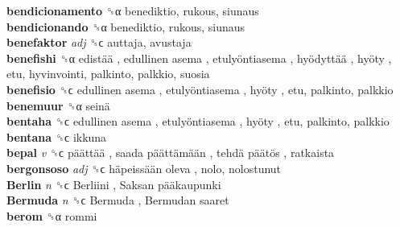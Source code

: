 \textbf{bendicionamento} ␝α  benediktio, rukous, siunaus  \\
\textbf{bendicionando} ␝α  benediktio, rukous, siunaus  \\
\textbf{benefaktor} \emph{adj}  ␝ϲ  auttaja, avustaja  \\
\textbf{benefishi} ␝α   edistää ,  edullinen asema ,  etulyöntiasema ,  hyödyttää ,  hyöty , etu, hyvinvointi, palkinto, palkkio, suosia  \\
\textbf{benefisio} ␝ϲ   edullinen asema ,  etulyöntiasema ,  hyöty , etu, palkinto, palkkio  \\
\textbf{benemuur} ␝α   seinä   \\
\textbf{bentaha} ␝ϲ   edullinen asema ,  etulyöntiasema ,  hyöty , etu, palkinto, palkkio  \\
\textbf{bentana} ␝ϲ  ikkuna  \\
\textbf{bepal} \emph{v}  ␝ϲ   päättää ,  saada päättämään ,  tehdä päätös , ratkaista  \\
\textbf{bergonsoso} \emph{adj}  ␝ϲ   häpeissään oleva , nolo, nolostunut  \\
\textbf{Berlin} \emph{n}  ␝ϲ   Berliini ,  Saksan pääkaupunki   \\
\textbf{Bermuda} \emph{n}  ␝ϲ   Bermuda ,  Bermudan saaret   \\
\textbf{berom} ␝α  rommi  \\
